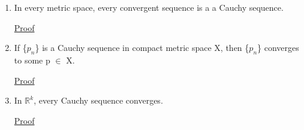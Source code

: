     \begin{enumerate}[label=(\alph*), leftmargin=2cm, itemsep=0.1cm]
        \item In every metric space, every convergent sequence is a
        a Cauchy sequence.

            { \color{magenta} \underline{Proof} }


        
        \item If \{$p_n$\} is a Cauchy sequence in compact metric space X,
        then \{$p_n$\} converges to some p $\in$ X.

            { \color{magenta} \underline{Proof} }


        
        \item In $\mathbb{R}^k$, every Cauchy sequence converges.
        
            { \color{magenta} \underline{Proof} }

                
    \end{enumerate}






























